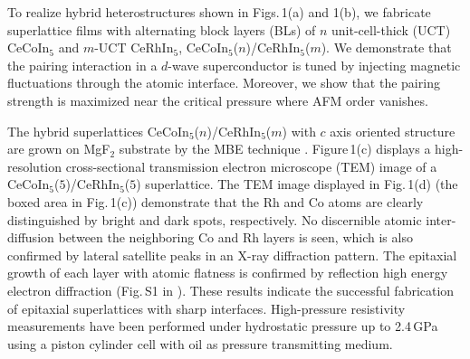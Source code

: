 \documentclass[twocolumn,preprintnumbers,amsmath,amssymb,prl]{revtex4}
\begin{document}
To realize hybrid heterostructures shown in Figs.\,1(a) and 1(b), we fabricate superlattice films with alternating block layers (BLs) of $n$ unit-cell-thick (UCT) CeCoIn$_5$ and $m$-UCT CeRhIn$_5$, CeCoIn$_5$($n$)/CeRhIn$_5$($m$). %
We demonstrate that the pairing interaction in a $d$-wave superconductor is tuned by injecting magnetic fluctuations through the atomic interface. Moreover, we show that the pairing strength is maximized near the critical pressure where AFM order vanishes. 



The hybrid superlattices CeCoIn$_5$($n$)/CeRhIn$_5$($m$) with $c$ axis oriented structure are grown on MgF$_2$ substrate by the MBE technique \cite{Shishido2010,Mizukami,Shimozawa2016}. 
Figure\,1(c) displays a high-resolution cross-sectional transmission electron microscope (TEM) image of a CeCoIn$_5$($5$)/CeRhIn$_5$($5$) superlattice.  The TEM image displayed in Fig.\,1(d) (the boxed area in Fig.\,1(c)) demonstrate that the Rh and Co atoms are clearly distinguished by bright and dark spots, respectively.  No discernible atomic inter-diffusion between the neighboring Co and Rh layers is seen, which is also confirmed by lateral satellite peaks in an X-ray diffraction pattern.  The epitaxial growth of each layer with atomic flatness is confirmed by  reflection high energy electron diffraction (Fig.\,S1 in \cite{SM}). These results indicate the successful fabrication of epitaxial superlattices with sharp interfaces.  
High-pressure resistivity measurements have been performed under hydrostatic pressure up to 2.4\,GPa using a piston cylinder cell with oil as pressure transmitting medium. %
\end{document}
